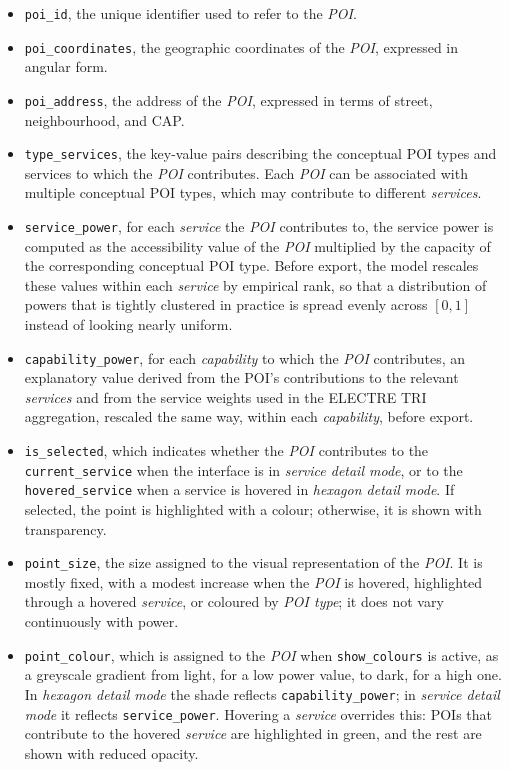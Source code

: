 \documentclass{article}
\begin{document}
\begin{itemize}
    \item \texttt{poi\_id}, the unique identifier used to refer to the \emph{POI}.
    \item \texttt{poi\_coordinates}, the geographic coordinates of the \emph{POI}, expressed in angular form.
    \item \texttt{poi\_address}, the address of the \emph{POI}, expressed in terms of street, neighbourhood, and CAP.
    \item \texttt{type\_services}, the key-value pairs describing the conceptual POI types and services to which the \emph{POI} contributes. Each \emph{POI} can be associated with multiple conceptual POI types, which may contribute to different \emph{services}.
    \item \texttt{service\_power}, for each \emph{service} the \emph{POI} contributes to, the service power is computed as the accessibility value of the \emph{POI} multiplied by the capacity of the corresponding conceptual POI type. Before export, the model rescales these values within each \emph{service} by empirical rank, so that a distribution of powers that is tightly clustered in practice is spread evenly across $[0,1]$ instead of looking nearly uniform.
    \item \texttt{capability\_power}, for each \emph{capability} to which the
    \emph{POI} contributes, an explanatory value derived from the POI's
    contributions to the relevant \emph{services} and from the service weights
    used in the ELECTRE TRI aggregation, rescaled the same way, within each \emph{capability}, before export.
   \item \texttt{is\_selected}, which indicates whether the \emph{POI} contributes to the \texttt{current\_service} when the interface is in \emph{service detail mode}, or to the \texttt{hovered\_service} when a service is hovered in \emph{hexagon detail mode}. If selected, the point is highlighted with a colour; otherwise, it is shown with transparency.
    \item \texttt{point\_size}, the size assigned to the visual representation of the \emph{POI}. It is mostly fixed, with a modest increase when the \emph{POI} is hovered, highlighted through a hovered \emph{service}, or coloured by \emph{POI type}; it does not vary continuously with power.
    \item \texttt{point\_colour}, which is assigned to the \emph{POI} when \texttt{show\_colours} is active, as a greyscale gradient from light, for a low power value, to dark, for a high one. In \emph{hexagon detail mode} the shade reflects \texttt{capability\_power}; in \emph{service detail mode} it reflects \texttt{service\_power}. Hovering a \emph{service} overrides this: POIs that contribute to the hovered \emph{service} are highlighted in green, and the rest are shown with reduced opacity.
\end{itemize}
\end{document}
